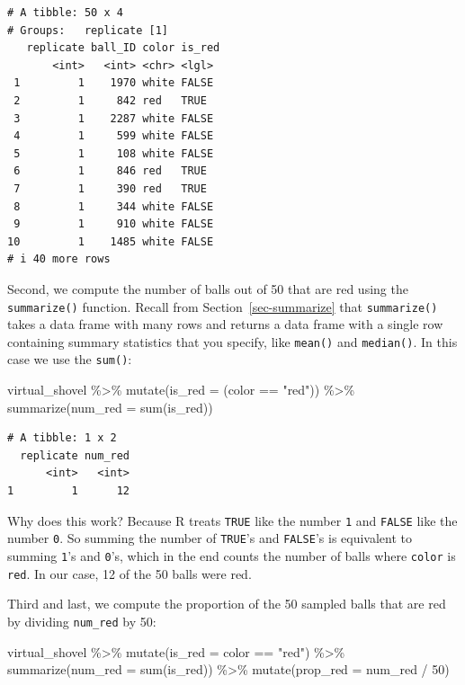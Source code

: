 \documentclass[
  letterpaper,
  DIV=11,
  numbers=noendperiod]{scrreprt}
\newenvironment{Shaded}{\begin{snugshade}}{\end{snugshade}}
\newcommand{\AttributeTok}[1]{\textcolor[rgb]{0.40,0.45,0.13}{#1}}
\newcommand{\DecValTok}[1]{\textcolor[rgb]{0.68,0.00,0.00}{#1}}
\newcommand{\FunctionTok}[1]{\textcolor[rgb]{0.28,0.35,0.67}{#1}}
\newcommand{\NormalTok}[1]{\textcolor[rgb]{0.00,0.23,0.31}{#1}}
\newcommand{\SpecialCharTok}[1]{\textcolor[rgb]{0.37,0.37,0.37}{#1}}
\newcommand{\StringTok}[1]{\textcolor[rgb]{0.13,0.47,0.30}{#1}}
\theoremstyle{definition}
\theoremstyle{remark}
\begin{document}
\begin{verbatim}
# A tibble: 50 x 4
# Groups:   replicate [1]
   replicate ball_ID color is_red
       <int>   <int> <chr> <lgl> 
 1         1    1970 white FALSE 
 2         1     842 red   TRUE  
 3         1    2287 white FALSE 
 4         1     599 white FALSE 
 5         1     108 white FALSE 
 6         1     846 red   TRUE  
 7         1     390 red   TRUE  
 8         1     344 white FALSE 
 9         1     910 white FALSE 
10         1    1485 white FALSE 
# i 40 more rows
\end{verbatim}

Second, we compute the number of balls out of 50 that are red using the
\texttt{summarize()} function. Recall from Section~\ref{sec-summarize}
that \texttt{summarize()} takes a data frame with many rows and returns
a data frame with a single row containing summary statistics that you
specify, like \texttt{mean()} and \texttt{median()}. In this case we use
the \texttt{sum()}:

\begin{Shaded}
\begin{Highlighting}[]
\NormalTok{virtual\_shovel }\SpecialCharTok{\%\textgreater{}\%} 
  \FunctionTok{mutate}\NormalTok{(}\AttributeTok{is\_red =}\NormalTok{ (color }\SpecialCharTok{==} \StringTok{"red"}\NormalTok{)) }\SpecialCharTok{\%\textgreater{}\%} 
  \FunctionTok{summarize}\NormalTok{(}\AttributeTok{num\_red =} \FunctionTok{sum}\NormalTok{(is\_red))  }
\end{Highlighting}
\end{Shaded}

\begin{verbatim}
# A tibble: 1 x 2
  replicate num_red
      <int>   <int>
1         1      12
\end{verbatim}

Why does this work? Because R treats \texttt{TRUE} like the number
\texttt{1} and \texttt{FALSE} like the number \texttt{0}. So summing the
number of \texttt{TRUE}'s and \texttt{FALSE}'s is equivalent to summing
\texttt{1}'s and \texttt{0}'s, which in the end counts the number of
balls where \texttt{color} is \texttt{red}. In our case, 12 of the 50
balls were red.

Third and last, we compute the proportion of the 50 sampled balls that
are red by dividing \texttt{num\_red} by 50:

\begin{Shaded}
\begin{Highlighting}[]
\NormalTok{virtual\_shovel }\SpecialCharTok{\%\textgreater{}\%} 
  \FunctionTok{mutate}\NormalTok{(}\AttributeTok{is\_red =}\NormalTok{ color }\SpecialCharTok{==} \StringTok{"red"}\NormalTok{) }\SpecialCharTok{\%\textgreater{}\%} 
  \FunctionTok{summarize}\NormalTok{(}\AttributeTok{num\_red =} \FunctionTok{sum}\NormalTok{(is\_red)) }\SpecialCharTok{\%\textgreater{}\%} 
  \FunctionTok{mutate}\NormalTok{(}\AttributeTok{prop\_red =}\NormalTok{ num\_red }\SpecialCharTok{/} \DecValTok{50}\NormalTok{)}
\end{Highlighting}
\end{Shaded}
\end{document}
